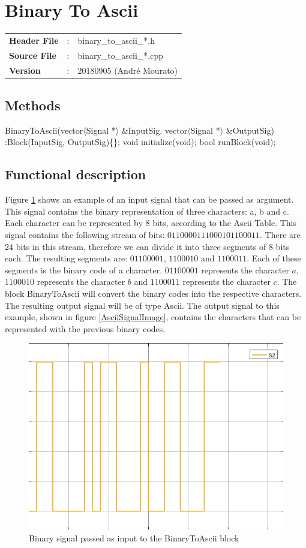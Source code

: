 \clearpage

\section{Binary To Ascii}

\begin{tcolorbox}	
	\begin{tabular}{p{2.75cm} p{0.2cm} p{10.5cm}} 	
		\textbf{Header File}   &:& binary\_to\_ascii\_*.h \\
		\textbf{Source File}   &:& binary\_to\_ascii\_*.cpp \\
        \textbf{Version}       &:& 20180905 (Andr\'e Mourato)
	\end{tabular}
\end{tcolorbox}

\subsection*{Methods}

BinaryToAscii(vector$\langle$Signal *$\rangle$ \&InputSig, vector$\langle$Signal *$\rangle$ \&OutputSig) :Block(InputSig, OutputSig)\{\};
\bigbreak
void initialize(void);
\bigbreak
bool runBlock(void);
\bigbreak

\subsection*{Functional description}

Figure \ref{BinarySignalImage} shows an example of an input signal that can be passed as argument. This signal contains the binary representation of three characters: a, b and c. Each character can be represented by 8 bits, according to the Ascii Table. This signal contains the following stream of bits: $0110000111000101100011$. There are 24 bits in this stream, therefore we can divide it into three segments of 8 bits each. The resulting segments are: $01100001$, $1100010$ and $1100011$. Each of these segments is the binary code of a character. $01100001$ represents the character $a$, $1100010$ represents the character $b$ and $1100011$ represents the character $c$.
The block BinaryToAscii will convert the binary codes into the respective characters. The resulting output signal will be of type Ascii. The output signal to this example, shown in figure \ref{AsciiSignalImage}, contains the characters that can be represented with the previous binary codes.

\begin{figure}[h]
	\centering
\includegraphics[width=.5\linewidth]{./lib/ascii_to_binary/figures/binary_signal.png}
\caption{Binary signal passed as input to the BinaryToAscii block}\label{BinarySignalImage}
\end{figure}


